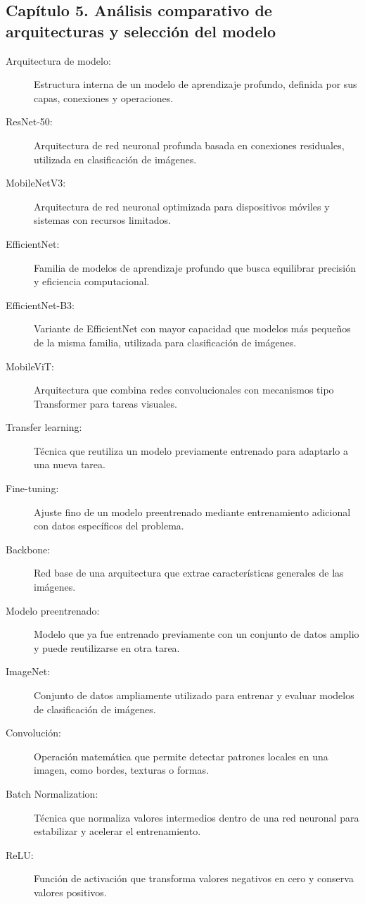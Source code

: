 \subsection*{Capítulo 5. Análisis comparativo de arquitecturas y selección del modelo}
\begin{description}
    \item[Arquitectura de modelo:] Estructura interna de un modelo de aprendizaje profundo, definida por sus capas, conexiones y operaciones.
    \item[ResNet-50:] Arquitectura de red neuronal profunda basada en conexiones residuales, utilizada en clasificación de imágenes.
    \item[MobileNetV3:] Arquitectura de red neuronal optimizada para dispositivos móviles y sistemas con recursos limitados.
    \item[EfficientNet:] Familia de modelos de aprendizaje profundo que busca equilibrar precisión y eficiencia computacional.
    \item[EfficientNet-B3:] Variante de EfficientNet con mayor capacidad que modelos más pequeños de la misma familia, utilizada para clasificación de imágenes.
    \item[MobileViT:] Arquitectura que combina redes convolucionales con mecanismos tipo Transformer para tareas visuales.
    \item[Transfer learning:] Técnica que reutiliza un modelo previamente entrenado para adaptarlo a una nueva tarea.
    \item[Fine-tuning:] Ajuste fino de un modelo preentrenado mediante entrenamiento adicional con datos específicos del problema.
    \item[Backbone:] Red base de una arquitectura que extrae características generales de las imágenes.
    \item[Modelo preentrenado:] Modelo que ya fue entrenado previamente con un conjunto de datos amplio y puede reutilizarse en otra tarea.
    \item[ImageNet:] Conjunto de datos ampliamente utilizado para entrenar y evaluar modelos de clasificación de imágenes.
    \item[Convolución:] Operación matemática que permite detectar patrones locales en una imagen, como bordes, texturas o formas.
    \item[Batch Normalization:] Técnica que normaliza valores intermedios dentro de una red neuronal para estabilizar y acelerar el entrenamiento.
    \item[ReLU:] Función de activación que transforma valores negativos en cero y conserva valores positivos.

\end{description}
